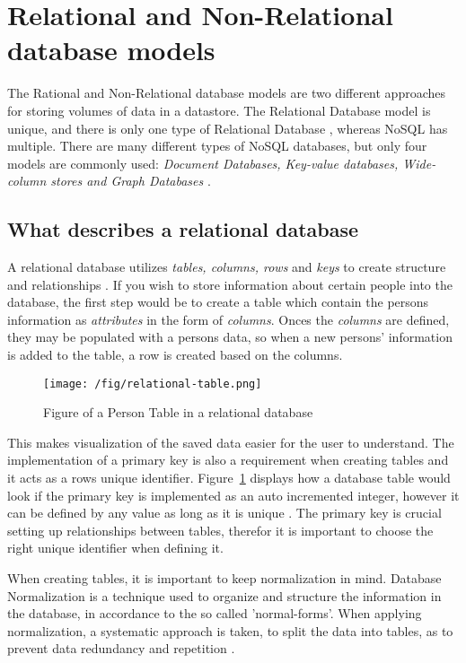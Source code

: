 \section{Relational and Non-Relational database models}
The Rational and Non-Relational database models are two different approaches for storing volumes of data in a datastore.
The Relational Database model is unique, and there is only one type of Relational Database \parencite{relational-vs-nosql-a-survey}, whereas NoSQL has multiple.
There are many different types of NoSQL databases, but only four models are commonly used: \emph{Document Databases, Key-value databases, Wide-column stores and Graph Databases} \parencite{mongodb-what-is-nosql}.



\subsection{What describes a relational database}
A relational database utilizes \emph{tables, columns, rows} and \emph{keys} to create structure and relationships \parencite{ibm-relational-databases}.
If you wish to store information about certain people into the database, the first step would be to create a table which contain the persons information as \emph{attributes} in the form of \emph{columns}.
Onces the \emph{columns} are defined, they may be populated with a persons data, so when a new persons' information is added to the table, a row is created based on the columns.\\

\begin{figure}[h]
    \centering
    \texttt{[image: /fig/relational-table.png]}
    \caption{Figure of a Person Table in a relational database}
    \label{fig:relational-database-table}
\end{figure}

This makes visualization of the saved data easier for the user to understand. The implementation of a primary key is also a requirement when creating tables and it acts as a rows unique identifier. Figure~\ref{fig:relational-database-table} displays how a database table would look if the primary key is implemented as an auto incremented integer, however it can be defined by any value as long as it is unique \parencite{ibm-relational-databases}.
The primary key is crucial setting up relationships between tables, therefor it is important to choose the right unique identifier when defining it.

When creating tables, it is important to keep normalization in mind.
Database Normalization is a technique used to organize and structure the information in the database, in accordance to the so called 'normal-forms'. When applying normalization, a systematic approach is taken, to split the data into tables, as to prevent data redundancy and repetition \parencite{microsoft-normaliziation}.\\

